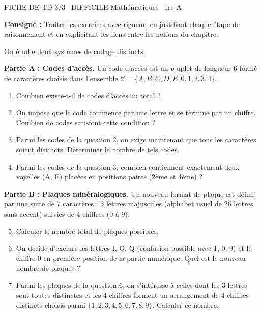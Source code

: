 \documentclass[11pt]{article}
\begin{document}
\begin{tcolorbox}[enhanced,colback=popink,colframe=popink,arc=10pt,boxrule=0pt,left=12pt,right=12pt,top=9pt,bottom=9pt]
{\color{white}\popxbold\small FICHE DE TD 3/3 \textbullet\ DIFFICILE \hfill Mathématiques \textbullet\ 1re A\par}
\end{tcolorbox}
\vspace{4pt}
\noindent\textbf{Consigne :} Traiter les exercices avec rigueur, en justifiant chaque étape de raisonnement et en explicitant les liens entre les notions du chapitre.

\begin{exercice}
On étudie deux systèmes de codage distincts.

\textbf{Partie A : Codes d'accès.} Un code d'accès est un $p$-uplet de longueur $6$ formé de caractères choisis dans l'ensemble $\mathcal{C} = \{A, B, C, D, E, 0, 1, 2, 3, 4\}$.
\begin{enumerate}
    \item Combien existe-t-il de codes d'accès au total ?
    \item On impose que le code commence par une lettre et se termine par un chiffre. Combien de codes satisfont cette condition ?
    \item Parmi les codes de la question 2, on exige maintenant que tous les caractères soient distincts. Déterminer le nombre de tels codes.
    \item Parmi les codes de la question 3, combien contiennent exactement deux voyelles (A, E) placées en positions paires (2ème et 4ème) ?
\end{enumerate}

\textbf{Partie B : Plaques minéralogiques.} Un nouveau format de plaque est défini par une suite de $7$ caractères : $3$ lettres majuscules (alphabet usuel de $26$ lettres, sans accent) suivies de $4$ chiffres ($0$ à $9$).
\begin{enumerate}\setcounter{enumi}{4}
    \item Calculer le nombre total de plaques possibles.
    \item On décide d'exclure les lettres I, O, Q (confusion possible avec 1, 0, 9) et le chiffre 0 en première position de la partie numérique. Quel est le nouveau nombre de plaques ?
    \item Parmi les plaques de la question 6, on s'intéresse à celles dont les $3$ lettres sont toutes distinctes et les $4$ chiffres forment un arrangement de $4$ chiffres distincts choisis parmi $\{1,2,3,4,5,6,7,8,9\}$. Calculer ce nombre.
\end{enumerate}
\end{exercice}
\end{document}
